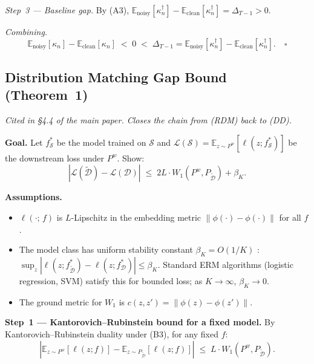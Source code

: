 \textit{Step~3 --- Baseline gap.}
By (A3), $\mathbb{E}_\text{noisy}[\kappa^\dagger_n] - \mathbb{E}_\text{clean}[\kappa^\dagger_n] = \Delta_{T-1} > 0$.

\textit{Combining.}
\begin{equation}
    \mathbb{E}_\text{noisy}[\kappa_n] - \mathbb{E}_\text{clean}[\kappa_n]
    \;<\; 0
    \;<\; \Delta_{T-1}
    = \mathbb{E}_\text{noisy}[\kappa^\dagger_n] - \mathbb{E}_\text{clean}[\kappa^\dagger_n].
    \quad \square
\end{equation}

\subsection{Distribution Matching Gap Bound (Theorem~1)}
\label{ch5:app:proof-gap}

\textit{Cited in \S4.4 of the main paper. Closes the chain from (RDM) back to (DD).}

\textbf{Goal.}
Let $f^*_\mathcal{S}$ be the model trained on $\mathcal{S}$ and $\mathcal{L}(\mathcal{S}) = \mathbb{E}_{z \sim P^w}[\ell(z; f^*_\mathcal{S})]$ be the downstream loss under $P^w$. Show:
\begin{equation}
    |\mathcal{L}(\tilde{\mathcal{D}}) - \mathcal{L}(\mathcal{D})|
    \;\leq\; 2L \cdot W_1(P^w, P_{\tilde{\mathcal{D}}}) + \beta_K.
\end{equation}

\textbf{Assumptions.}
\begin{itemize}
    \item[\textbf{(B1)}] $\ell(\cdot;\,f)$ is $L$-Lipschitz in the embedding metric $\|\phi(\cdot) - \phi(\cdot)\|$ for all $f$.
    \item[\textbf{(B2)}] The model class has uniform stability constant $\beta_K = O(1/K)$ \cite{bousquet2002stability}: $\sup_z |\ell(z; f^*_{\tilde{\mathcal{D}}}) - \ell(z; f^*_\mathcal{D})| \leq \beta_K$. Standard ERM algorithms (logistic regression, SVM) satisfy this for bounded loss; as $K \to \infty$, $\beta_K \to 0$.
    \item[\textbf{(B3)}] The ground metric for $W_1$ is $c(z,z') = \|\phi(z) - \phi(z')\|$.
\end{itemize}

\textbf{Step~1 --- Kantorovich--Rubinstein bound for a fixed model.}
By Kantorovich--Rubinstein duality \cite{villani2008optimal} under (B3), for any fixed $f$:
\begin{equation}
    \left|
        \mathbb{E}_{z \sim P^w}[\ell(z; f)]
        - \mathbb{E}_{z \sim P_{\tilde{\mathcal{D}}}}[\ell(z; f)]
    \right|
    \;\leq\; L \cdot W_1(P^w, P_{\tilde{\mathcal{D}}}).
\end{equation}


